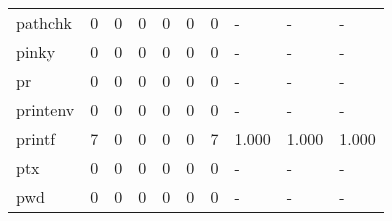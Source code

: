 \begin{longtable}{lp{2.0cm}p{2.0cm}p{2.0cm}p{2.0cm}p{2.0cm}p{2.0cm}p{2.0cm}p{2.0cm}p{2.0cm}}
pathchk   &                      0 &                                             0 &                                            0 &                                           0 &                                            0 &                                          0 &                                    - &                                      - &                                    - \\
pinky     &                      0 &                                             0 &                                            0 &                                           0 &                                            0 &                                          0 &                                    - &                                      - &                                    - \\
pr        &                      0 &                                             0 &                                            0 &                                           0 &                                            0 &                                          0 &                                    - &                                      - &                                    - \\
printenv  &                      0 &                                             0 &                                            0 &                                           0 &                                            0 &                                          0 &                                    - &                                      - &                                    - \\
printf    &                      7 &                                             0 &                                            0 &                                           0 &                                            0 &                                          7 &                                1.000 &                                  1.000 &                                1.000 \\
ptx       &                      0 &                                             0 &                                            0 &                                           0 &                                            0 &                                          0 &                                    - &                                      - &                                    - \\
pwd       &                      0 &                                             0 &                                            0 &                                           0 &                                            0 &                                          0 &                                    - &                                      - &                                    - \\

\end{longtable}
